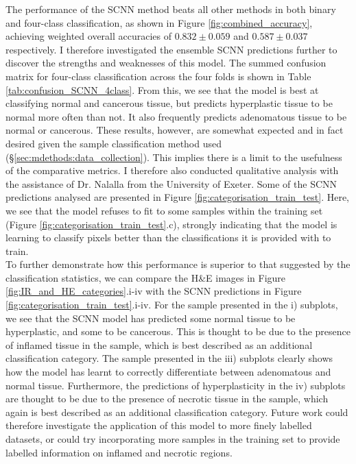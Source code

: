 The performance of the SCNN method beats all other methods in both binary and four-class classification, as shown in Figure \ref{fig:combined_accuracy}, achieving weighted overall accuracies of $0.832\pm0.059$ and $0.587\pm0.037$ respectively. I therefore investigated the ensemble SCNN predictions further to discover the strengths and weaknesses of this model. The summed confusion matrix for four-class classification across the four folds is shown in Table \ref{tab:confusion_SCNN_4class}. From this, we see that the model is best at classifying normal and cancerous tissue, but predicts hyperplastic tissue to be normal more often than not. It also frequently predicts adenomatous tissue to be normal or cancerous. These results, however, are somewhat expected and in fact desired given the sample classification method used (§\ref{sec:mdethods:data_collection}). This implies there is a limit to the usefulness of the comparative metrics. I therefore also conducted qualitative analysis with the assistance of Dr. Nalalla from the University of Exeter. Some of the SCNN predictions analysed are presented in Figure \ref{fig:categorisation_train_test}. Here, we see that the model refuses to fit to some samples within the training set (Figure \ref{fig:categorisation_train_test}.c), strongly indicating that the model is learning to classify pixels better than the classifications it is provided with to train.\\

\noindent
To further demonstrate how this performance is superior to that suggested by the classification statistics, we can compare the H\&E images in Figure \ref{fig:IR_and_HE_categories}.i-iv with the SCNN predictions in Figure \ref{fig:categorisation_train_test}.i-iv. For the sample presented in the i) subplots, we see that the SCNN model has predicted some normal tissue to be hyperplastic, and some to be cancerous. This is thought to be due to the presence of inflamed tissue in the sample, which is best described as an additional classification category. The sample presented in the iii) subplots clearly shows how the model has learnt to correctly differentiate between adenomatous and normal tissue. Furthermore, the predictions of hyperplasticity in the iv) subplots are thought to be due to the presence of necrotic tissue in the sample, which again is best described as an additional classification category. Future work could therefore investigate the application of this model to more finely labelled datasets, or could try incorporating more samples in the training set to provide labelled information on inflamed and necrotic regions. \\

